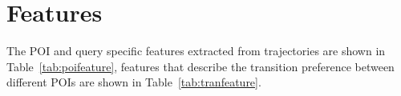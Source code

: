 

\section{Features}
\label{sec:feature}


The POI and query specific features extracted from trajectories are shown in Table~\ref{tab:poifeature},
features that describe the transition preference between different POIs are shown in Table~\ref{tab:tranfeature}.



